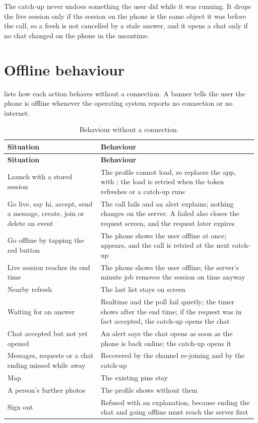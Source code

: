 The catch-up never undoes something the user did while it was running. It drops the live session only if
the session on the phone is the same object it was before the call, so a fresh  is not
cancelled by a stale answer, and it opens a chat only if no chat changed on the phone in the meantime.

\section{Offline behaviour}
\label{sec:offline}

 lists how each action behaves without a connection. A banner tells the user the phone
is offline whenever the operating system reports no connection or no internet.

\begingroup\tablefont
\begin{longtable}{@{}L{46mm}L{\dimexpr\linewidth-46mm-2\tabcolsep\relax}@{}}
  \caption{Behaviour without a connection.}
  \label{tab:offline}\\
  \toprule
  \textsf{\textbf{Situation}} & \textsf{\textbf{Behaviour}} \\
  \midrule
  \endfirsthead
  \toprule
  \textsf{\textbf{Situation}} & \textsf{\textbf{Behaviour}} \\
  \midrule
  \endhead
  \bottomrule
  \endfoot
  Launch with a stored session & The profile cannot load, so  replaces the app, with ; the load is retried when the token refreshes or a catch-up runs \\
  Go live, say hi, accept, send a message, create, join or delete an event & The call fails and an alert explains; nothing changes on the server. A failed  also closes the request screen, and the request later expires \\
  Go offline by tapping the red button & The phone shows the user offline at once;  appears, and the call is retried at the next catch-up \\
  Live session reaches its end time & The phone shows the user offline; the server's minute job removes the session on time anyway \\
  Nearby refresh & The last list stays on screen \\
  Waiting for an answer & Realtime and the poll fail quietly; the timer shows  after the end time; if the request was in fact accepted, the catch-up opens the chat \\
  Chat accepted but not yet opened & An alert says the chat opens as soon as the phone is back online; the catch-up opens it \\
  Messages, requests or a chat ending missed while away & Recovered by the channel re-joining and by the catch-up \\
  Map & The existing pins stay \\
  A person's further photos & The profile shows without them \\
  Sign out & Refused with an explanation, because ending the chat and going offline must reach the server first \\
\end{longtable}
\endgroup

